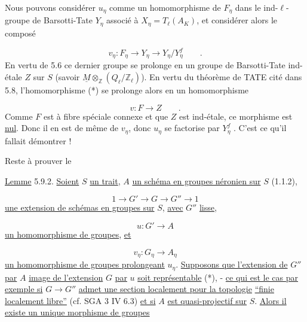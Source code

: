 Nous pouvons considérer $u_\eta$ comme un homomorphisme de $F_\eta$ dans le ind-$\ell$-groupe de Barsotti-Tate $Y_\eta$ associé à $X_\eta = T_\ell(A_K)$, et considérer alors le composé



\begin{equation}\tag{*}
v_\eta : F_\eta \longrightarrow Y_\eta \longrightarrow Y_\eta/Y_\eta^f \qquad .
\end{equation}
En vertu de 5.6 ce dernier groupe se prolonge en un groupe de Barsotti-Tate ind-étale $Z$ sur $S$ (savoir $\underline{M} \otimes_{\mathbb{Z}} (Q_\ell/\mathbb{Z}_\ell)$). En vertu du théorème de TATE cité dans 5.8, l'homomorphisme (*) se prolonge alors en un homomorphisme

\begin{equation*}
v : F \longrightarrow Z \qquad .
\end{equation*}
Comme $F$ est à fibre spéciale connexe et que $Z$ est ind-étale, ce morphisme est \underline{nul}. Donc il en est de même de $v_\eta$, donc $u_\eta$ se factorise par $Y_\eta^f$ . C'est ce qu'il fallait démontrer !

Reste à prouver le

\underline{Lemme} 5.9.2. \underline{Soient} $S$ \underline{un trait}, $A$ \underline{un schéma en groupes néronien sur} $S$ (1.1.2),

\begin{equation*}
1 \longrightarrow G' \longrightarrow G \longrightarrow G'' \longrightarrow 1
\end{equation*}
\underline{une extension de schémas en groupes sur} $S$, \underline{avec} $G''$ \underline{lisse,}

\begin{equation*}
u : G' \longrightarrow A
\end{equation*}
\underline{un homomorphisme de groupes}, \underline{et}

\begin{equation*}
v_\eta : G_\eta \longrightarrow A_\eta
\end{equation*}
\underline{un homomorphisme de groupes prolongeant} $u_\eta$. \underline{Supposons que l'extension de} $G''$ \underline{par} $A$ \underline{image de l'extension} $G$ \underline{par} $u$ \underline{soit représentable} (*), - \underline{ce qui est le cas par exemple si} $G \longrightarrow G''$ \underline{admet une section localement pour la topologie} \underline{``finie localement libre''} (cf. SGA 3 IV 6.3) \underline{et si} $A$ \underline{est quasi-projectif sur} $S$. \underline{Alors il existe un unique morphisme de groupes}


